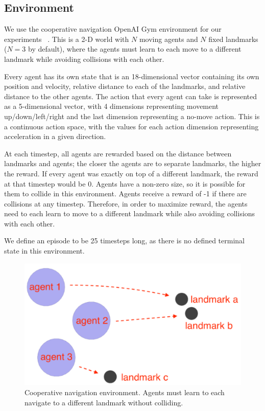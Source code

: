 \documentclass{article}
\begin{document}
\subsection{Environment}

We use the cooperative navigation OpenAI Gym environment for our experiments ~\cite{openaigym}. This is a 2-D world with $N$ moving agents and $N$ fixed landmarks ($N=3$ by default), where the agents must learn to each move to a different landmark while avoiding collisions with each other.

Every agent has its own state that is an 18-dimensional vector containing its own position and velocity, relative distance to each of the landmarks, and relative distance to the other agents. The action that every agent can take is represented as a 5-dimensional vector, with 4 dimensions representing movement up/down/left/right and the last dimension representing a no-move action. This is a continuous action space, with the values for each action dimension representing acceleration in a given direction.

At each timestep, all agents are rewarded based on the distance between landmarks and agents; the closer the agents are to separate landmarks, the higher the reward. If every agent was exactly on top of a different landmark, the reward at that timestep would be 0. Agents have a non-zero size, so it is possible for them to collide in this environment. Agents receive a reward of -1 if there are collisions at any timestep. Therefore, in order to maximize reward, the agents need to each learn to move to a different landmark while also avoiding collisions with each other.

We define an episode to be 25 timesteps long, as there is no defined terminal state in this environment.

\begin{figure}
\begin{center}
\includegraphics[scale=0.5]{env-image}
\end{center}
\caption{Cooperative navigation environment. Agents must learn to each navigate to a different landmark without colliding.}
\end{figure}
\end{document}
